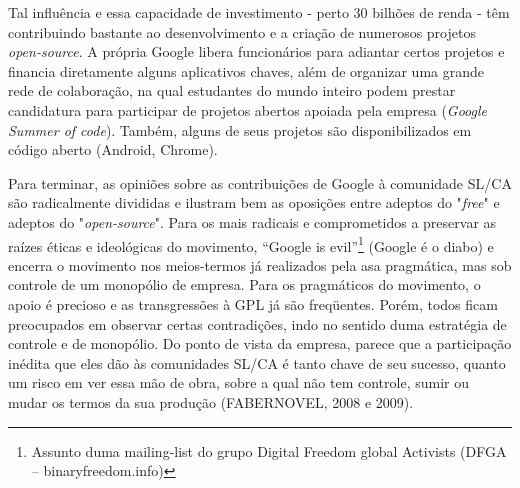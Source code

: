 Tal influência e essa capacidade de investimento - perto 30 bilhões de renda - têm contribuindo bastante ao desenvolvimento e a criação de numerosos projetos \emph{open-source}. A própria Google libera funcionários para adiantar certos projetos e financia diretamente alguns aplicativos chaves, além de organizar uma grande rede de colaboração, na qual estudantes do mundo inteiro podem prestar candidatura para participar de projetos abertos apoiada pela empresa (\emph{Google Summer of code}). Também, alguns de seus projetos são disponibilizados em código aberto (Android, Chrome).

Para terminar, as opiniões sobre as contribuições de Google à comunidade SL/CA são radicalmente divididas e ilustram bem as oposições entre adeptos do "\emph{free}" e adeptos do "\emph{open-source}". Para os mais radicais e comprometidos a preservar as raízes éticas e ideológicas do movimento, “Google is evil”\footnote{Assunto duma mailing-list do grupo Digital Freedom global Activists (DFGA – binaryfreedom.info)} (Google é o diabo) e encerra o movimento nos meios-termos já realizados pela asa pragmática, mas sob controle de um monopólio de empresa. Para os pragmáticos do movimento, o apoio é precioso e as transgressões à GPL já são freqüentes. Porém, todos ficam preocupados em observar certas contradições, indo no sentido duma estratégia de controle e de monopólio. Do ponto de vista da empresa, parece que a participação inédita que eles dão às comunidades SL/CA é tanto chave de seu sucesso, quanto um risco em ver essa mão de obra, sobre a qual não tem controle, sumir ou mudar os termos da sua produção (FABERNOVEL, 2008 e 2009).
